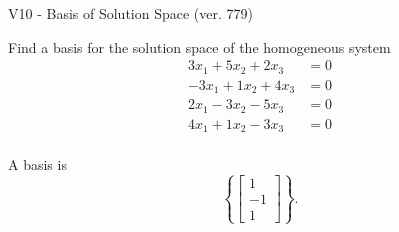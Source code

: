 \begin{exercise}
  \begin{exerciseTitle}V10 - Basis of Solution Space (ver. 779)\end{exerciseTitle}
  \begin{exerciseStatement}
    Find a basis for the solution space of the homogeneous system 
\begin{align*}
 3 x_ 1 + 5 x_ 2 + 2 x_ 3 &= 0  \\ 
  -3 x_ 1 + 1 x_ 2 + 4 x_ 3 &= 0  \\ 
  2 x_ 1 -3 x_ 2 -5 x_ 3 &= 0  \\ 
  4 x_ 1 + 1 x_ 2 -3 x_ 3 &= 0  \\ 
 \end{align*}


 
  \end{exerciseStatement}

  \begin{exerciseAnswer}
   A basis is   
\[\left\{\left[\begin{array}{c}
1 \\
-1 \\
1
\end{array}\right]\right\}.\]

  


  \end{exerciseAnswer}
\end{exercise}